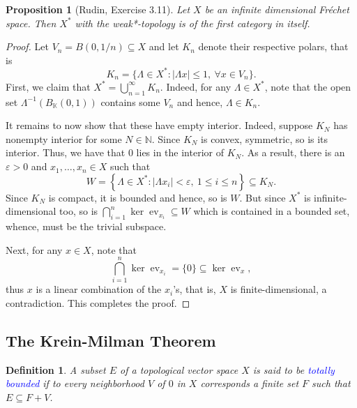 \documentclass[12pt]{article}
\theoremstyle{thmstyle}
\newtheorem{proposition}[theorem]{Proposition}
\theoremstyle{defstyle}
\newtheorem{definition}[theorem]{Definition}
\newcommand{\R}{\mathbb{R}}
\newcommand{\N}{\mathbb{N}}
\newcommand{\bbC}{\mathbb{C}}
\newcommand{\K}{\mathbb{K}} %
\newcommand{\ev}{\operatorname{ev}}
\newcommand{\define}[1]{\textcolor{blue}{\textit{#1}}}
\renewcommand{\le}{\leqslant}
\begin{document}
\begin{proposition}[Rudin, Exercise 3.11]
    Let $X$ be an infinite dimensional Fr\'echet space. Then $X^\ast$ with the weak*-topology is of the first category in itself.
\end{proposition}
\begin{proof}
    Let $V_n = B(0, 1/n)\subseteq X$ and let $K_n$ denote their respective polars, that is 
    \begin{equation*}
        K_n = \{\Lambda\in X^\ast\colon |\Lambda x|\le 1,~\forall x\in V_n\}.
    \end{equation*}
    First, we claim that $\displaystyle X^\ast = \bigcup_{n = 1}^\infty K_n$. Indeed, for any $\Lambda\in X^\ast$, note that the open set $\Lambda^{-1}(B_{\K}(0, 1))$ contains some $V_n$ and hence, $\Lambda\in K_n$.

    It remains to now show that these have empty interior. Indeed, suppose $K_N$ has nonempty interior for some $N\in\N$. Since $K_N$ is convex, symmetric, so is its interior. Thus, we have that $0$ lies in the interior of $K_N$. As a result, there is an $\varepsilon > 0$ and $x_1,\dots, x_n\in X$ such that 
    \begin{equation*}
        W = \left\{\Lambda\in X^\ast\colon |\Lambda x_i| < \varepsilon,~1\le i\le n\right\}\subseteq K_N.
    \end{equation*}
    Since $K_N$ is compact, it is bounded and hence, so is $W$. But since $X^\ast$ is infinite-dimensional too, so is $\bigcap_{i = 1}^n\ker\ev_{x_i}\subseteq W$ which is contained in a bounded set, whence, must be the trivial subspace.

    Next, for any $x\in X$, note that 
    \begin{equation*}
        \bigcap_{i = 1}^n \ker\ev_{x_i} = \{0\}\subseteq\ker\ev_x,
    \end{equation*}
    thus $x$ is a linear combination of the $x_i$'s, that is, $X$ is finite-dimensional, a contradiction. This completes the proof.
\end{proof}

\subsection{The Krein-Milman Theorem}

\begin{definition}
    A subset $E$ of a topological vector space $X$ is said to be \define{totally bounded} if to every neighborhood $V$ of $0$ in $X$ corresponds a finite set $F$ such that $E\subseteq F + V$.
\end{definition}
\end{document}
